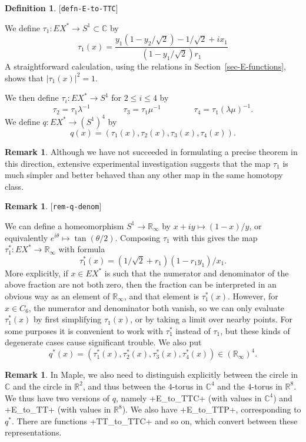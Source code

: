 \documentclass[reqno]{amsart}
\newcommand{\lbl}[1]{\label{#1}\textup{[\texttt{#1}]}\par}
\newcommand{\lbl}{\label}
\newcommand{\tht}       {\theta}
\newcommand{\lm}        {\lambda}
\newcommand{\R}         {{\mathbb{R}}}
\newcommand{\C}         {{\mathbb{C}}}
\newcommand{\rt}        {\sqrt{2}}
\renewcommand{\:}{\colon}
\theoremstyle{definition}
\newtheorem{remark}[theorem]{Remark}
\newtheorem{definition}[theorem]{Definition}
\begin{document}
\begin{definition}\lbl{defn-E-to-TTC}
 We define $\tau_1\:EX^*\to S^1\subset\C$ by
 \[ \tau_1(x) =
     \frac{y_1(1-y_2/\rt)-1/\rt+ix_1}{(1-y_1/\rt)r_1}
 \]
 A straightforward calculation, using the relations in
 Section~\ref{sec-E-functions}, shows that $|\tau_1(x)|^2=1$.

 We then define $\tau_i\:EX^*\to S^1$ for $2\leq i\leq 4$ by
 \[ \tau_2 = \tau_1\lm^{-1} \hspace{4em}
    \tau_3 = \tau_1\mu^{-1} \hspace{4em}
    \tau_4 = \tau_1(\lm\mu)^{-1}.
 \]
 We define $q\:EX^*\to(S^1)^4$ by
 \[ q(x) = (\tau_1(x),\tau_2(x),\tau_3(x),\tau_4(x)). \]
\end{definition}
\begin{remark}
 Although we have not succeeded in formulating a precise theorem in
 this direction, extensive experimental investigation suggests that
 the map $\tau_1$ is much simpler and better behaved than any other
 map in the same homotopy class.
\end{remark}

\begin{remark}\lbl{rem-q-denom}
 We can define a homeomorphism $S^1\to\R_\infty$ by
 $x+iy\mapsto(1-x)/y$, or equivalently
 $e^{i\tht}\mapsto\tan(\tht/2)$.  Composing $\tau_1$ with this gives
 the map $\tau_1^*\:EX^*\to\R_\infty$ with formula
 \[ \tau_1^*(x) = (1/\rt+r_1)(1-r_1y_1)/x_1. \]
 More explicitly, if $x\in EX^*$ is such that the numerator and
 denominator of the above fraction are not both zero, then the
 fraction can be interpreted in an obvious way as an element of
 $\R_\infty$, and that element is $\tau_1^*(x)$.  However, for
 $x\in C_6$, the numerator and denominator both vanish, so we can only
 evaluate $\tau_1^*(x)$ by first simplifying $\tau_1(x)$, or by taking
 a limit over nearby points.  For some purposes it is convenient to
 work with $\tau_1^*$ instead of $\tau_1$, but these kinds of
 degenerate cases cause significant trouble.  We also put
 \[ q^*(x) = (\tau_1^*(x),\tau_2^*(x),\tau_3^*(x),\tau_4^*(x))
     \in (\R_\infty)^4.
 \]
\end{remark}
\begin{remark}
 In Maple, we also need to distinguish explicitly between the circle
 in $\C$ and the circle in $\R^2$, and thus between the $4$-torus in
 $\C^4$ and the $4$-torus in $\R^8$.  We thus have two versions of
 $q$, namely \mcode+E_to_TTC+ (with values in $\C^4$) and
 \mcode+E_to_TT+ (with values in $\R^8$).  We also have
 \mcode+E_to_TTP+, corresponding to $q^*$.  There are functions
 \mcode+TT_to_TTC+ and so on, which convert between these
 representations.
\end{remark}
\end{document}

